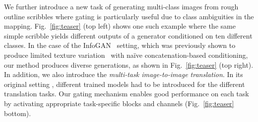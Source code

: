 We further introduce a new task of generating multi-class images from rough outline scribbles where gating is particularly useful due to class ambiguities in the mapping. Fig.~\ref{fig:teaser} (top left) shows one such example where the same simple scribble yields different outputs of a generator conditioned on ten different classes.
In the case of the InfoGAN~\cite{chen2016infogan} setting, which was previously shown to produce limited texture variation~\cite{ghosh2017multi} with na\"ive concatenation-based conditioning, our method produces diverse generations, as shown in Fig.~\ref{fig:teaser} (top right).
In addition, we also introduce the {\em multi-task image-to-image translation}. In its original setting \cite{isola2016image2image}, different trained models had to be introduced for the different translation tasks. Our gating mechanism enables good performance on each task by activating appropriate task-specific blocks and channels (Fig.~\ref{fig:teaser} bottom).












